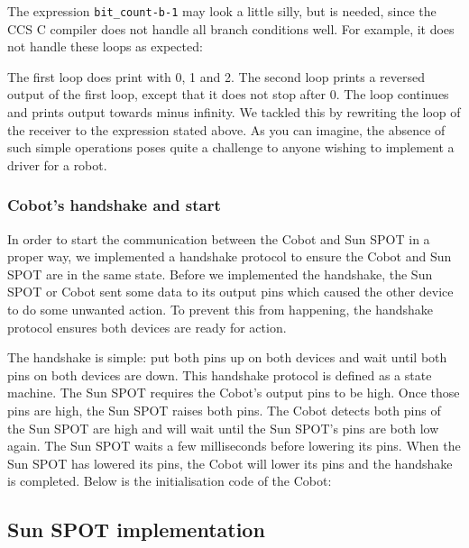 \documentclass[a4paper,10pt]{article} %
\begin{document}


\noindent The expression \texttt{bit\_count-b-1} may look a little silly, but is
needed, since the CCS C compiler does not handle all branch conditions well. For
example, it does not handle these loops as expected:



\noindent The first loop does print  with 0, 1 and 2. The second loop
prints a reversed output of the first loop, except that it does not stop after
0. The loop continues and prints output towards minus infinity.  We tackled this
by rewriting the loop of the receiver to the expression stated above.  As you
can imagine, the absence of such simple operations poses quite a challenge to
anyone wishing to implement a driver for a robot.


\subsubsection{Cobot's handshake and start} %
\label{ssub:Cobot's handshake and start}

In order to start the communication between the Cobot and Sun SPOT in a proper
way, we implemented a handshake protocol to ensure the Cobot and Sun SPOT are in
the same state. Before we implemented the handshake, the Sun SPOT or Cobot sent
some data to its output pins which caused the other device to do some unwanted
action. To prevent this from happening, the handshake protocol ensures both
devices are ready for action.

The handshake is simple: put both pins up on both devices and wait until both
pins on both devices are down. This handshake protocol is defined as a state
machine. The Sun SPOT requires the Cobot's output pins to be high. Once those
pins are high, the Sun SPOT raises both pins. The Cobot detects both pins of the
Sun SPOT are high and will wait until the Sun SPOT's pins are both low again.
The Sun SPOT waits a few milliseconds before lowering its pins. When the Sun
SPOT has lowered its pins, the Cobot will lower its pins and the handshake is
completed. Below is the initialisation code of the Cobot:





\subsection{Sun SPOT implementation} %
\label{sub:Sun SPOT implementation}
\end{document}

